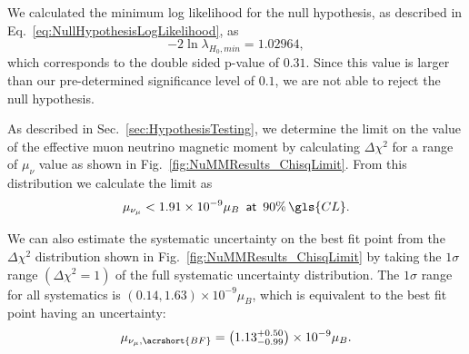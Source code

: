 
We calculated the minimum log likelihood for the null hypothesis, as described in Eq.~\ref{eq:NullHypothesisLogLikelihood}, as 
\begin{equation}
-2\ln\lambda_{H_0,min}=1.02964,
\end{equation}
which corresponds to the double sided p-value of $0.31$. Since this value is larger than our pre-determined significance level of $0.1$, we are not able to reject the null hypothesis.

As described in Sec.~\ref{sec:HypothesisTesting}, we determine the limit on the value of the effective muon neutrino magnetic moment by calculating $\Delta\chi^2$ for a range of $\mu_\nu$ value as shown in Fig.~\ref{fig:NuMMResults_ChisqLimit}. From this distribution we calculate the limit as
\begin{equation}\label{eq:NuMMLimit}
\mu_{\nu_\mu}<1.91\times10^{-9}\mu_B\,\,\,\textsf{at}\,\,\,90\%\, \gls{CL}.
\end{equation} 

We can also estimate the systematic uncertainty on the best fit point from the $\Delta\chi^2$ distribution shown in  Fig.~\ref{fig:NuMMResults_ChisqLimit} by taking the $1\sigma$ range $\left(\Delta\chi^2=1\right)$ of the full systematic uncertainty distribution. The $1\sigma$ range for all systematics is $\left(0.14,1.63\right)\times 10^{-9}\mu_B$, which is equivalent to the best fit point having an uncertainty:
\begin{equation}
\mu_{\nu_\mu,\acrshort{BF}}=\left(1.13^{+0.50}_{-0.99}\right)\times 10^{-9}\mu_B.
\end{equation}

